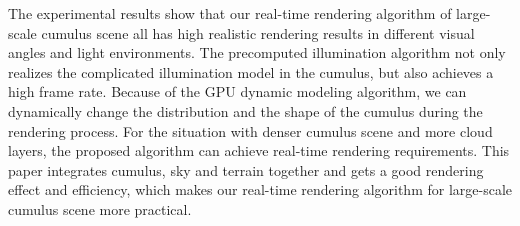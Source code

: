 {The experimental results show that our real-time rendering algorithm of large-scale cumulus scene all has high realistic rendering results in different visual angles and light environments. The precomputed illumination algorithm not only realizes the complicated illumination model in the cumulus, but also achieves a high frame rate. Because of the GPU dynamic modeling algorithm, we can dynamically change the distribution and the shape of the cumulus during the rendering process. For the situation with denser cumulus scene and more cloud layers, the proposed algorithm can achieve real-time rendering requirements. This paper integrates cumulus, sky and terrain together and gets a good rendering effect and efficiency, which makes our real-time rendering algorithm for large-scale cumulus scene more practical.


}
